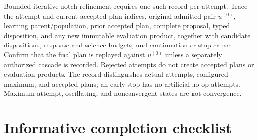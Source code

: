 \documentclass[10pt]{article}
\begin{document}
Bounded iterative notch refinement requires one such record per attempt. Trace
the attempt and current accepted-plan indices, original admitted pair
$u^{(0)}$, learning
parent/population, prior accepted plan, complete proposal, typed disposition,
and any new immutable evaluation product, together with candidate dispositions, response
and science budgets, and continuation or stop cause. Confirm that the final
plan is replayed against $u^{(0)}$ unless a separately authorized
cascade is recorded. Rejected attempts do not create accepted plans or
evaluation products.  The record distinguishes actual attempts, configured
maximum, and accepted plans; an early stop has no artificial no-op attempts.
Maximum-attempt, oscillating, and nonconvergent states are not convergence.

\section{Informative completion checklist}
\label{sec:eng-checklist}
\end{document}

